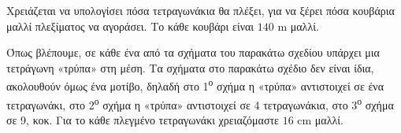 \documentclass[11pt,a4paper,twoside]{book}
\begin{document}
Χρειάζεται να υπολογίσει πόσα τετραγωνάκια θα πλέξει, για να ξέρει πόσα κουβάρια μαλλί πλεξίματος να αγοράσει. Το κάθε κουβάρι είναι $140$ m μαλλί.

Όπως βλέπουμε, σε κάθε ένα από τα σχήματα του παρακάτω σχεδίου υπάρχει μια τετράγωνη «τρύπα» στη μέση. Τα σχήματα στο παρακάτω σχέδιο δεν είναι ίδια, ακολουθούν όμως ένα μοτίβο, δηλαδή στο 1\textsuperscript{ο} σχήμα η «τρύπα» αντιστοιχεί σε ένα τετραγωνάκι, στο 2\textsuperscript{ο} σχήμα η «τρύπα» αντιστοιχεί σε 4 τετραγωνάκια, στο 3\textsuperscript{ο} σχήμα σε 9, κοκ. Για το κάθε πλεγμένο τετραγωνάκι χρειαζόμαστε $16$ cm μαλλί.

\begin{marginfigure}

\end{marginfigure}
\end{document}
